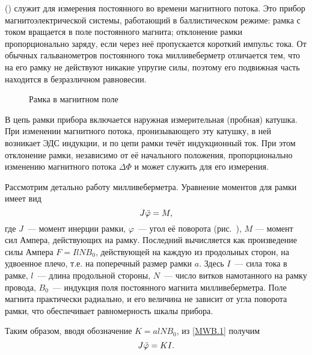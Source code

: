 
\begin{labsupplement}
\label{MWB}

 () служит для измерения постоянного во времени
магнитного потока. Это прибор магнитоэлектрической системы, 
работающий в баллистическом режиме: рамка с током вращается в поле 
постоянного магнита; отклонение рамки пропорционально заряду,
если через неё пропускается короткий импульс тока. 
От обычных гальванометров постоянного тока милливеберметр 
отличается тем, что на его рамку не действуют никакие упругие силы, 
поэтому его подвижная часть находится в безразличном равновесии.

\begin{figure}[h!]
    \caption{Рамка в магнитном поле}
\end{figure}

В цепь рамки прибора включается наружная измерительная (пробная) катушка. 
При изменении магнитного потока, пронизывающего эту катушку, 
в ней возникает ЭДС индукции, и по цепи рамки течёт индукционный ток. 
При этом отклонение рамки, независимо от её начального
положения, пропорционально изменению магнитного потока $\Delta\Phi$ 
и может служить для его измерения.

Рассмотрим детально работу милливеберметра. 
Уравнение моментов для рамки имеет вид
\begin{equation}
    J\ddot{\varphi}=M,
    \eqmark{MWB.1}
\end{equation}
где $J$~--- момент инерции рамки, 
$\varphi$~--- угол её поворота (рис.~),
$M$ --- момент сил Ампера, действующих на рамку.
Последний вычисляется как произведение силы Ампера $F=IlNB_0$, 
действующей на каждую из продольных сторон,
на удвоенное плечо, т.е. на поперечный размер
рамки $a$. Здесь $I$~--- сила тока в рамке, $l$~--- длина продольной
стороны, $N$~--- число витков намотанного на рамку провода, 
$B_0$~--- индукция поля постоянного магнита милливеберметра. 
Поле магнита практически радиально, и его величина не зависит от угла поворота
рамки, что обеспечивает равномерность шкалы прибора. 

Таким образом, вводя обозначение $K=alNB_0$, из \eqref{MWB.1} 
получим
\begin{equation}
    J\ddot{\varphi}=KI.
    \eqmark{MWB.2}
\end{equation}


\end{labsupplement}
